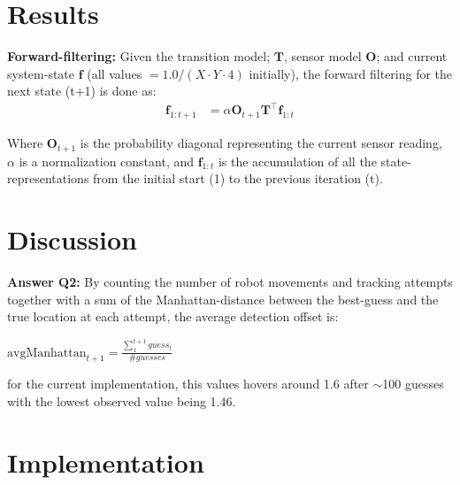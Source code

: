 \documentclass{article}
\newcommand{\mat}[1]{$\textbf{#1}$}
\newcommand{\mmat}[1]{\mathbf{#1}}
\renewcommand{\vec}[1]{$\textbf{#1}$}
\newcommand{\mvec}[1]{\mathbf{#1}}
\begin{document}
  \section*{Results}

    \textbf{Forward-filtering:} Given the transition model; \mat{T}, sensor
    model \mat{O}; and current system-state \vec{f} (all values
    $= 1.0/(X{\cdot}Y{\cdot}4)$ initially), the forward filtering for the next
    state (t+1) is done as:
    \begin{align*}
      \mvec{f}_{1:t+1} &= {\alpha}\mmat{O}_{t+1}\mmat{T}^\top\mvec{f}_{1:t}
    \end{align*}

    Where \mat{O}$_{t+1}$ is the probability diagonal representing the current
    sensor reading, $\alpha$ is a normalization constant, and $\mvec{f}_{1:t}$
    is the accumulation of all the state-representations from the initial start
    (1) to the previous iteration (t).

  \section*{Discussion}

    \textbf{Answer Q2:} By counting the number of robot movements and tracking
    attempts together with a sum of the Manhattan-distance between the
    best-guess and the true location at each attempt, the average detection
    offset is:

    \begin{center}
      $\textrm{avgManhattan}_{t+1} = \frac{\sum_{1}^{t+1} guess_t}{\#guesses}$
    \end{center}

    for the current implementation, this values hovers around 1.6 after
    $\sim$100 guesses with the lowest observed value being 1.46.

  \section*{Implementation}
\end{document}
